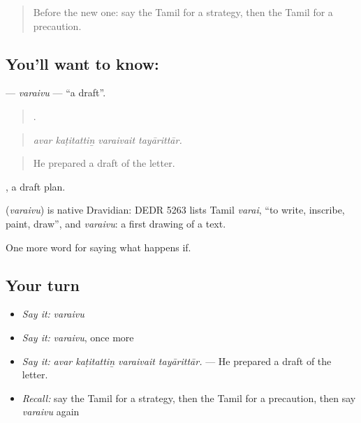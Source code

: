 \label{lesson:TA-C386-varaivu}



\begin{quote}
Before the new one: say the Tamil for a strategy, then the Tamil for a precaution.
\end{quote}

\subsection*{You'll want to know: }
\textbf{} — \emph{varaivu} — \textquotedblleft{}a draft\textquotedblright{}.

\begin{quote}
   .
\end{quote}

\begin{quote}
\emph{avar kaṭitattiṉ varaivait tayārittār.}
\end{quote}

\begin{quote}
He prepared a draft of the letter.
\end{quote}

 , a draft plan.

\begin{cousinweb}
\textbf{} (\emph{varaivu}) is native Dravidian: DEDR 5263 lists Tamil \emph{varai}, \textquotedblleft{}to write, inscribe, paint, draw\textquotedblright{}, and \emph{varaivu}: a first drawing of a text.
\end{cousinweb}

\begin{grammarlens}[title={What you've built}]
One more word for saying what happens if.
\end{grammarlens}

\subsection*{Your turn}
\begin{itemize}
\raggedright
  \item \emph{Say it:} \emph{varaivu}
  \item \emph{Say it:} \emph{varaivu}, once more
  \item \emph{Say it:} \emph{avar kaṭitattiṉ varaivait tayārittār.} — He prepared a draft of the letter.
  \item \emph{Recall:} say the Tamil for a strategy, then the Tamil for a precaution, then say \emph{varaivu} again
\end{itemize}

